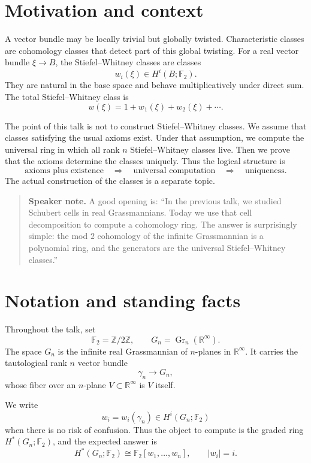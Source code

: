 \documentclass[11pt]{article}
\theoremstyle{remark}
\newcommand{\F}{\mathbb F}
\newcommand{\R}{\mathbb R}
\newcommand{\Gr}{\operatorname{Gr}}
\newcommand{\Gn}{G_n}
\newcommand{\gamman}{\gamma_n}
\newenvironment{talknote}{\begin{quote}\small\textbf{Speaker note.} }{\end{quote}}
\begin{document}
\section{Motivation and context}

A vector bundle may be locally trivial but globally twisted.  Characteristic classes are cohomology classes that detect part of this global twisting.  For a real vector bundle $\xi\to B$, the Stiefel--Whitney classes are classes
\[
  w_i(\xi)\in H^i(B;\F_2).
\]
They are natural in the base space and behave multiplicatively under direct sum.  The total Stiefel--Whitney class is
\[
  w(\xi)=1+w_1(\xi)+w_2(\xi)+\cdots .
\]

The point of this talk is not to construct Stiefel--Whitney classes.  We assume that classes satisfying the usual axioms exist.  Under that assumption, we compute the universal ring in which all rank $n$ Stiefel--Whitney classes live.  Then we prove that the axioms determine the classes uniquely.  Thus the logical structure is
\[
  \text{axioms plus existence}\quad\Longrightarrow\quad
  \text{universal computation}\quad\Longrightarrow\quad
  \text{uniqueness}.
\]
The actual construction of the classes is a separate topic.

\begin{talknote}
A good opening is: ``In the previous talk, we studied Schubert cells in real Grassmannians.  Today we use that cell decomposition to compute a cohomology ring.  The answer is surprisingly simple: the mod $2$ cohomology of the infinite Grassmannian is a polynomial ring, and the generators are the universal Stiefel--Whitney classes.''
\end{talknote}

\section{Notation and standing facts}

Throughout the talk, set
\[
  \F_2=\mathbb Z/2\mathbb Z,
  \qquad
  \Gn=\Gr_n(\R^\infty).
\]
The space $\Gn$ is the infinite real Grassmannian of $n$-planes in $\R^\infty$.  It carries the tautological rank $n$ vector bundle
\[
  \gamman\longrightarrow \Gn,
\]
whose fiber over an $n$-plane $V\subset \R^\infty$ is $V$ itself.

We write
\[
  w_i=w_i(\gamman)\in H^i(\Gn;\F_2)
\]
when there is no risk of confusion.  Thus the object to compute is the graded ring $H^*(\Gn;\F_2)$, and the expected answer is
\[
  H^*(\Gn;\F_2)\cong \F_2[w_1,\dots,w_n],\qquad |w_i|=i.
\]
\end{document}
